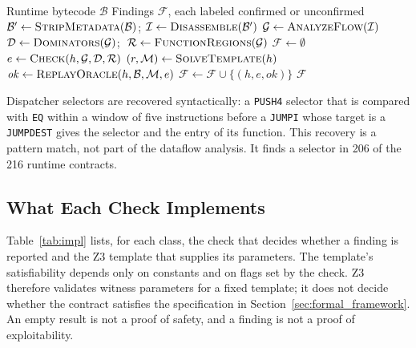 \documentclass[pdflatex,sn-mathphys]{sn-jnl}
\theoremstyle{thmstyleone}
\theoremstyle{thmstyletwo}
\begin{document}
\begin{algorithm}[t]
\caption{EVM-Guard static verification and replay triage pipeline}
\label{alg:verification}
\begin{algorithmic}[1]
\Require Runtime bytecode $\mathcal{B}$
\Ensure Findings $\mathcal{F}$, each labeled confirmed or unconfirmed
\State $\mathcal{B}' \gets \Call{StripMetadata}{\mathcal{B}}$; $\mathcal{I} \gets \Call{Disassemble}{\mathcal{B}'}$
\State $\mathcal{G} \gets \Call{AnalyzeFlow}{\mathcal{I}}$ 
\State $\mathcal{D} \gets \Call{Dominators}{\mathcal{G}}$; $\;\mathcal{R} \gets \Call{FunctionRegions}{\mathcal{G}}$
\State $\mathcal{F} \gets \emptyset$
    \State $e \gets \Call{Check}{h, \mathcal{G}, \mathcal{D}, \mathcal{R}}$ 
        \State $(r, \mathcal{M}) \gets \Call{SolveTemplate}{h}$
            \State $\mathit{ok} \gets \Call{ReplayOracle}{h, \mathcal{B}, \mathcal{M}, e}$
            \State $\mathcal{F} \gets \mathcal{F} \cup \{(h, e, \mathit{ok})\}$
        \EndIf
    \EndIf
\EndFor
\State \Return $\mathcal{F}$ 
\end{algorithmic}
\end{algorithm}

Dispatcher selectors are recovered syntactically: a \texttt{PUSH4} selector that is compared with \texttt{EQ} within a window of five instructions before a \texttt{JUMPI} whose target is a \texttt{JUMPDEST} gives the selector and the entry of its function. This recovery is a pattern match, not part of the dataflow analysis. It finds a selector in 206 of the 216 runtime contracts.

\subsection{What Each Check Implements}\label{sec:arch:scope}
Table~\ref{tab:impl} lists, for each class, the check that decides whether a finding is reported and the Z3 template that supplies its parameters. The template's satisfiability depends only on constants and on flags set by the check. Z3 therefore validates witness parameters for a fixed template; it does not decide whether the contract satisfies the specification in Section~\ref{sec:formal_framework}. An empty result is not a proof of safety, and a finding is not a proof of exploitability.
\end{document}
